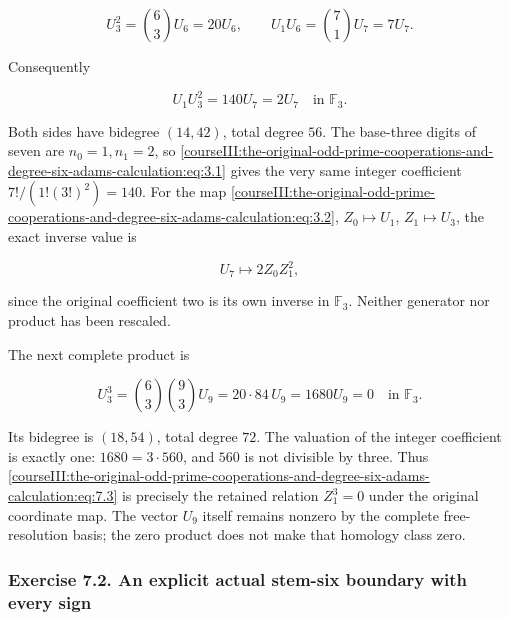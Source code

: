 \[
 U_3^2=\binom63U_6=20U_6,
 \qquad U_1U_6=\binom71U_7=7U_7.
\]

Consequently

\begin{equation}
U_1U_3^2=140U_7=2U_7\quad\text{in }\mathbb F_3.
 \label{courseIII:the-original-odd-prime-cooperations-and-degree-six-adams-calculation:eq:7.1}
\end{equation}

Both sides have bidegree \((14,42)\), total degree \(56\). The base-three digits of seven are \(n_0=1,n_1=2\), so \eqref{courseIII:the-original-odd-prime-cooperations-and-degree-six-adams-calculation:eq:3.1} gives the very same integer coefficient \(7!/(1!(3!)^2)=140\). For the map \eqref{courseIII:the-original-odd-prime-cooperations-and-degree-six-adams-calculation:eq:3.2}, \(Z_0\mapsto U_1\), \(Z_1\mapsto U_3\), the exact inverse value is

\begin{equation}
U_7\longmapsto 2Z_0Z_1^2,
 \label{courseIII:the-original-odd-prime-cooperations-and-degree-six-adams-calculation:eq:7.2}
\end{equation}

since the original coefficient two is its own inverse in \(\mathbb F_3\). Neither generator nor product has been rescaled.

The next complete product is

\begin{equation}
U_3^3=\binom63\binom93U_9
 =20\cdot84\,U_9=1680U_9=0\quad\text{in }\mathbb F_3.
 \label{courseIII:the-original-odd-prime-cooperations-and-degree-six-adams-calculation:eq:7.3}
\end{equation}

Its bidegree is \((18,54)\), total degree \(72\). The valuation of the integer coefficient is exactly one: \(1680=3\cdot560\), and \(560\) is not divisible by three. Thus \eqref{courseIII:the-original-odd-prime-cooperations-and-degree-six-adams-calculation:eq:7.3} is precisely the retained relation \(Z_1^3=0\) under the original coordinate map. The vector \(U_9\) itself remains nonzero by the complete free-resolution basis; the zero product does not make that homology class zero.

\subsubsection{Exercise 7.2. An explicit actual stem-six boundary with every sign}
\label{courseIII:the-original-odd-prime-cooperations-and-degree-six-adams-calculation:exercise-7.2}

